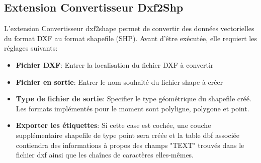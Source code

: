 
\subsection{Extension Convertisseur Dxf2Shp}


L'extension Convertisseur dxf2shape permet de convertir des données 
vectorielles du format DXF au format shapefile (SHP). Avant d'être exécutée, 
elle requiert les réglages suivants:

\begin{itemize}
\item \textbf{Fichier DXF}: Entrer la localisation du fichier DXF à convertir
\item \textbf{Fichier en sortie}: Entrer le nom souhaité du fichier shape à créer
\item \textbf{Type de fichier de sortie}: Specifier le type géométrique du 
shapefile créé. 
Les formats implémentés pour le moment sont polyligne, polygone et point.
\item \textbf{Exporter les étiquettes}: Si cette case est cochée, une couche 
supplémentaire shapefile de type point sera créée et la table dbf associée 
contiendra des informations à propos des champs "TEXT" trouvés dans le fichier 
dxf ainsi que les chaînes de caractères elles-mêmes.
\end{itemize}

